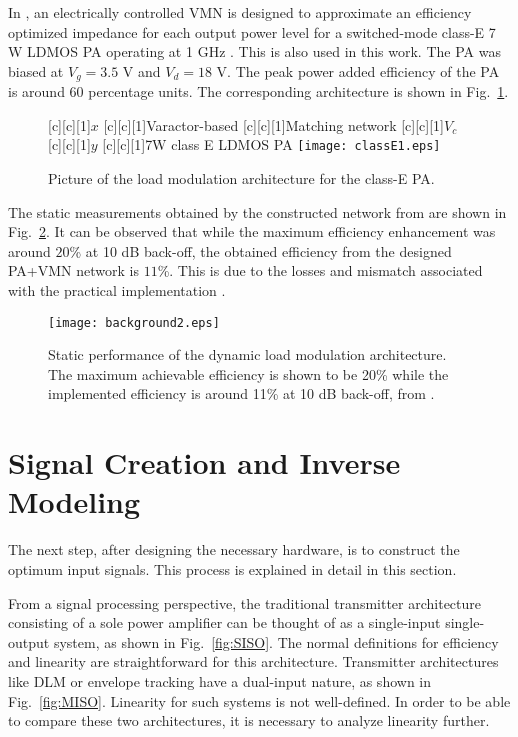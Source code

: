 \documentclass[10pt,journal]{IEEEtran}
\begin{document}
In \cite{hosseinEMW}, an electrically controlled VMN is designed to approximate an efficiency optimized impedance for each output power level for a switched-mode class-E 7 W LDMOS PA operating at 1 GHz \cite{adahl}. This is also used in this work. The PA was biased at $V_g=3.5$ V and $V_d = 18$ V. The peak power added efficiency of the PA is around 60 percentage units. The corresponding architecture is shown in Fig.~\ref{classE}.

\begin{figure}
\centering
{}[c][c][1]{$x$} [c][c][1]{Varactor-based} [c][c][1]{Matching network} [c][c][1]{$V_c$} [c][c][1]{$y$} [c][c][1]{7W class E LDMOS PA}
\texttt{[image: classE1.eps]}
\caption{Picture of the load modulation architecture for the class-E PA.}
\label{classE}
\end{figure}

The static measurements obtained by the constructed network from \cite{hosseinMTT} are shown in Fig.~\ref{back}. It can be observed that while the maximum efficiency enhancement was around $20$\% at 10 dB back-off, the obtained efficiency from the designed PA+VMN network is $11$\%. This is due to the losses and mismatch associated with the practical implementation \cite{hosseinMTT}.

\begin{figure}
\centering
\texttt{[image: background2.eps]}
\caption{Static performance of the dynamic load modulation architecture. The maximum achievable efficiency is shown to be 20\% while the implemented efficiency is around 11\% at 10 dB back-off, from \cite{hosseinMTT,soltani}.}
\label{back}
\end{figure}

\section{Signal Creation and Inverse Modeling}
The next step, after designing the necessary hardware, is to construct the optimum input signals. This process is explained in detail in this section.

From a signal processing perspective, the traditional transmitter architecture consisting of a sole power amplifier can be thought of as a single-input single-output system, as shown in Fig.~\ref{fig:SISO}. The normal definitions for efficiency and linearity are straightforward for this architecture. Transmitter architectures like DLM or envelope tracking have a dual-input nature, as shown in Fig.~\ref{fig:MISO}. Linearity for such systems is not well-defined. In order to be able to compare these two architectures, it is necessary to analyze linearity further.
\end{document}
